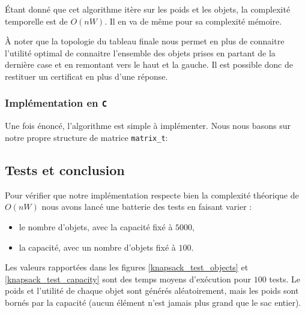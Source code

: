 Étant donné que cet algorithme itère sur les poids et les objets, la
complexité temporelle est de $O(nW)$. Il en va de même pour sa
complexité mémoire.

À noter que la topologie du tableau finale nous permet en plus de connaitre l'utilité optimal de connaitre l'ensemble des objets prises en partant de la dernière case et en remontant vers le haut et la gauche. Il est possible donc de restituer un certificat en plus d'une réponse.

\subsubsection{Implémentation en \texttt{C}}
Une fois énoncé, l'algorithme est simple à implémenter. Nous nous
basons sur notre propre structure de matrice \texttt{matrix\_t}:

 


\subsection{Tests et conclusion}

Pour vérifier que notre implémentation respecte bien la complexité théorique de $O(nW)$ nous avons lancé une batterie des tests en faisant varier : 

\begin{itemize}
\item le nombre d'objets, avec la capacité fixé à $5000$,
\item la capacité, avec un nombre d'objets fixé à $100$.
\end{itemize}

Les valeurs rapportées dans les figures \ref{knapsack_test_objects} et
\ref{knapsack_test_capacity} sont des temps moyens d'exécution pour
$100$ tests. Le poids et l'utilité de chaque objet sont générés
aléatoirement, mais les poids sont bornés par la capacité (aucun
élément n'est jamais plus grand que le sac entier).

